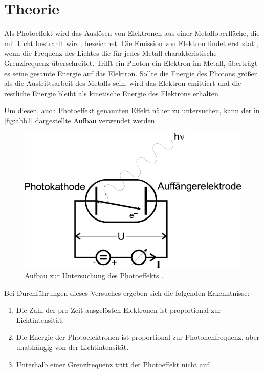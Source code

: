 \section{Theorie}
\label{sec:theorie}

Als Photoeffekt wird das Auslösen von Elektronen aus einer Metalloberfläche, die mit Licht bestrahlt wird, bezeichnet.
Die Emission von Elektron findet erst statt, wenn die Frequenz des Lichtes die für jedes Metall charakteristische Grenzfrequenz überschreitet.
Trifft ein Photon ein Elektron im Metall, überträgt es seine gesamte Energie auf das Elektron.
Sollte die Energie des Photons größer als die Austrittsarbeit des Metalls sein, wird das Elektron emittiert und die restliche Energie bleibt als kinetische Energie des Elektrons erhalten.

Um diesen, auch Photoeffekt genannten Effekt näher zu untersuchen,
kann der in \autoref{fig:abb1} dargestellte Aufbau verwendet werden.

\begin{figure}[H]
    \centering
    \includegraphics{figures/Abb1.pdf}
    \caption{Aufbau zur Untersuchung des Photoeffekts \cite{ap10}.}
    \label{fig:abb1}
\end{figure}

Bei Durchführungen dieses Versuches ergeben sich die folgenden Erkenntnisse:

\begin{enumerate}
    \item Die Zahl der pro Zeit ausgelösten Elektronen ist proportional zur Lichtintensität.
    \item Die Energie der Photoelektronen ist proportional zur Photonenfrequenz, aber unabhängig von der Lichtintensität.
    \item Unterhalb einer Grenzfrequenz tritt der Photoeffekt nicht auf.
\end{enumerate}

